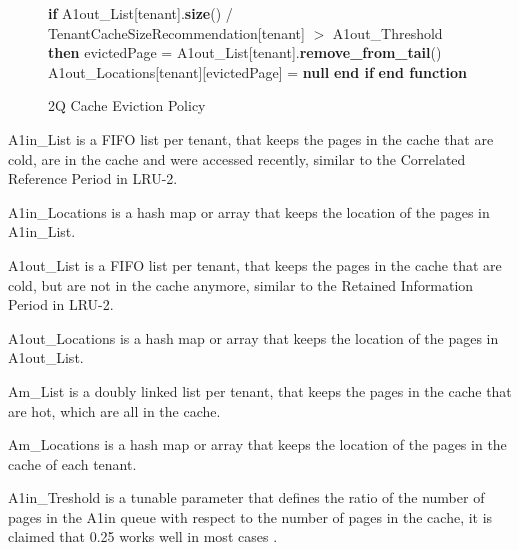 \begin{figure}[htbp]
\begin{minipage}{\linewidth}
\begin{algorithm}[H]
\begin{algorithmic}
            \STATE \hspace{\algorithmicindent} \hspace{\algorithmicindent} \textbf{if} A1out\_List[tenant].\textbf{size}() / TenantCacheSizeRecommendation[tenant] $>$ A1out\_Threshold \textbf{then}
            \STATE \hspace{\algorithmicindent} \hspace{\algorithmicindent} \hspace{\algorithmicindent} evictedPage = A1out\_List[tenant].\textbf{remove\_from\_tail}()
            \STATE \hspace{\algorithmicindent} \hspace{\algorithmicindent} \hspace{\algorithmicindent} A1out\_Locations[tenant][evictedPage] = \textbf{null}
            \STATE \hspace{\algorithmicindent} \hspace{\algorithmicindent} \textbf{end if}
            \STATE \textbf{end function}
        \end{algorithmic}
    \end{algorithm}
    \caption{2Q Cache Eviction Policy}
    \label{fig:2q}
    \end{minipage}
\end{figure}

\newpage

A1in\_List is a FIFO list per tenant, that keeps the pages in the cache that are cold, are
in the cache and were accessed recently, similar to the Correlated Reference Period in LRU-2.

A1in\_Locations is a hash map or array that keeps the location of the pages in A1in\_List.  

A1out\_List is a FIFO list per tenant, that keeps the pages in the cache that are cold, but
are not in the cache anymore, similar to the Retained Information Period in LRU-2.

A1out\_Locations is a hash map or array that keeps the location of the pages in A1out\_List.

Am\_List is a doubly linked list per tenant, that keeps the pages in the cache that are hot,
which are all in the cache.

Am\_Locations is a hash map or array that keeps the location of the pages in the cache of each
tenant.

A1in\_Treshold is a tunable parameter that defines the ratio of the number of pages in the A1in
queue with respect to the number of pages in the cache, it is claimed that 0.25 works well in
most cases \cite{2q-article}.

